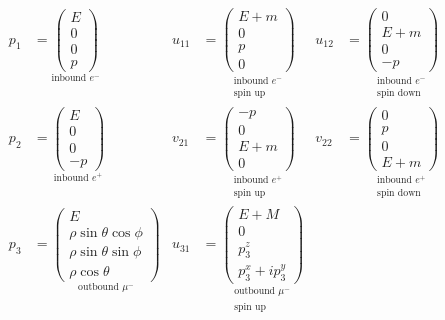 \documentclass[12pt]{article}
\begin{document}
\begin{align*}
p_1&=\underset{\text{inbound $e^-$}}
{\begin{pmatrix}E\\0\\0\\p\end{pmatrix}}
& u_{11}&=\underset{\substack{\text{inbound $e^-$}\\\text{spin up}}}
{\begin{pmatrix}E+m\\0\\p\\0\end{pmatrix}}
& u_{12}&=\underset{\substack{\text{inbound $e^-$}\\\text{spin down}}}
{\begin{pmatrix}0\\E+m\\0\\-p\end{pmatrix}}
\\[1ex]
p_2&=\underset{\text{inbound $e^+$}}
{\begin{pmatrix}E\\0\\0\\-p\end{pmatrix}}
& v_{21}&=\underset{\substack{\text{inbound $e^+$}\\\text{spin up}}}
{\begin{pmatrix}-p\\0\\E+m\\0\end{pmatrix}}
& v_{22}&=\underset{\substack{\text{inbound $e^+$}\\\text{spin down}}}
{\begin{pmatrix}0\\p\\0\\E+m\end{pmatrix}}
\\[1ex]
p_3&=\underset{\text{outbound $\mu^-$}}
{\begin{pmatrix}
E\\
\rho\sin\theta\cos\phi\\
\rho\sin\theta\sin\phi\\
\rho\cos\theta
\end{pmatrix}}
& u_{31}&=\underset{\substack{\text{outbound $\mu^-$}\\\text{spin up}}}
{\begin{pmatrix}E+M\\0\\p_3^z\\p_3^x+ip_3^y\end{pmatrix}}

\end{align*}
\end{document}
